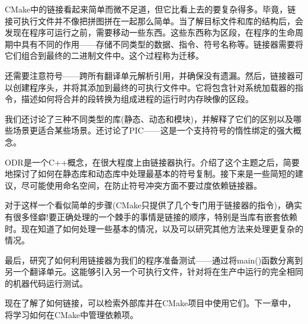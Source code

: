 CMake中的链接看起来简单而微不足道，但它比看上去的要复杂得多。毕竟，链接可执行文件并不像把拼图拼在一起那么简单。当了解目标文件和库的结构后，会发现在程序可运行之前，需要移动一些东西。这些东西称为区段，在程序的生命周期中具有不同的作用——存储不同类型的数据、指令、符号名称等。链接器需要将它们组合到最终的二进制文件中。这个过程称为迁移。

还需要注意符号——跨所有翻译单元解析引用，并确保没有遗漏。然后，链接器可以创建程序头，并将其添加到最终的可执行文件中。它将包含针对系统加载器的指令，描述如何将合并的段转换为组成进程的运行时内存映像的区段。

我们还讨论了三种不同类型的库(静态、动态和模块)，并解释了它们的区别以及哪些场景更适合某些场景。还讨论了PIC——这是一个支持符号的惰性绑定的强大概念。

ODR是一个C++概念，在很大程度上由链接器执行。介绍了这个主题之后，简要地探讨了如何在静态库和动态库中处理最基本的符号复制。接下来是一些简短的建议，尽可能使用命名空间，在防止符号冲突方面不要过度依赖链接器。

对于这样一个看似简单的步骤(CMake只提供了几个专门用于链接器的指令)，确实有很多怪癖!要正确处理的一个棘手的事情是链接的顺序，特别是当库有嵌套依赖时。现在知道了如何处理一些基本的情况，以及可以研究其他方法来处理更复杂的情况。

最后，研究了如何利用链接器为我们的程序准备测试——通过将main()函数分离到另一个翻译单元。这能够引入另一个可执行文件，针对将在生产中运行的完全相同的机器代码运行测试。

现在了解了如何链接，可以检索外部库并在CMake项目中使用它们。下一章中，将学习如何在CMake中管理依赖项。